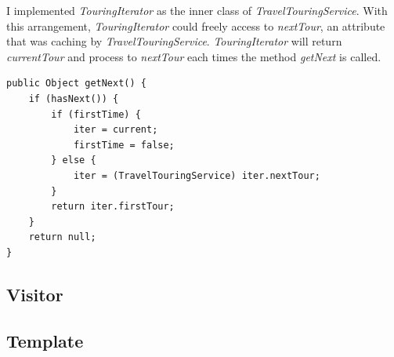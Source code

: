 I implemented \textit{TouringIterator} as the inner class of \textit{TravelTouringService}. With this arrangement, \textit{TouringIterator} could freely access to \textit{nextTour}, an attribute that was caching by \textit{TravelTouringService}. \textit{TouringIterator} will return \textit{currentTour} and process to \textit{nextTour} each times the method \textit{getNext} is called. 

\begin{lstlisting}
public Object getNext() {
	if (hasNext()) {
		if (firstTime) {
			iter = current;
			firstTime = false;
		} else {
			iter = (TravelTouringService) iter.nextTour;
		}
		return iter.firstTour;
	}
	return null;
}
\end{lstlisting}

\newpage
\subsection{Visitor}



\subsection{Template}